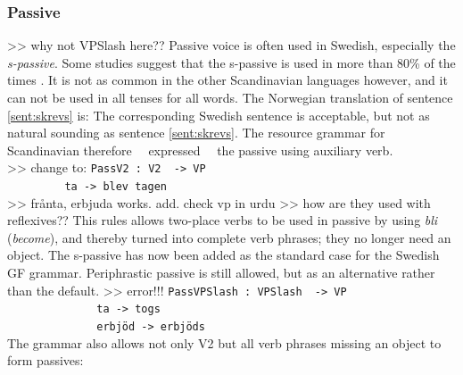 \documentclass{report}
\begin{document}
\subsubsection{Passive}
>> why not VPSlash here??
Passive voice is often used in Swedish, especially the
\textit{s-passive}.
\label{sent:skrevs}
Some studies suggest that the s-passive is used in more than 80\% of the times \cite{laanemets}.
It is not as common in the other Scandinavian languages however, 
and it can not be used in all tenses for all words. The Norwegian 
translation of sentence \ref{sent:skrevs} is:
The corresponding Swedish sentence is acceptable, but not as natural sounding as sentence
\ref{sent:skrevs}.
The resource grammar for Scandinavian therefore ~~expressed~~ the passive using auxiliary verb. \\
>> change to:
\verb|PassV2 : V2  -> VP | \\
\verb|         ta -> blev tagen| \\
>> frånta, erbjuda works. add. check vp in urdu
>> how are they used with reflexives??
This rules allows two-place verbs to be used in passive by using \emph{bli} (\emph{become}), and thereby
turned into complete verb phrases; they no longer need an object.
The s-passive has now been added as the standard case for the Swedish GF
grammar. Periphrastic passive is still allowed, but as an alternative rather
than the default.
>> error!!! 
\verb|PassVPSlash : VPSlash  -> VP | \\
\verb|              ta -> togs| \\
\verb|              erbjöd -> erbjöds| \\
The grammar also allows not only V2 but all verb phrases missing an object to 
form passives:
\label{ex:passV32}
\label{ex:passV33}
\label{ex:passV2A}
\end{document}
